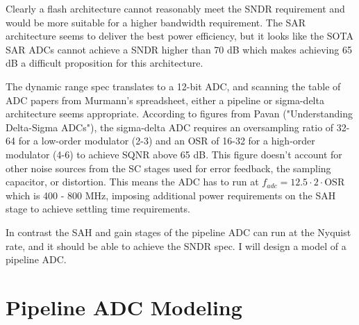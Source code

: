 \documentclass[11pt]{article}
\begin{document}
Clearly a flash architecture cannot reasonably meet the SNDR requirement and would be more suitable for a higher bandwidth requirement.
The SAR architecture seems to deliver the best power efficiency, but it looks like the SOTA SAR ADCs cannot achieve a SNDR higher than 70 dB which makes achieving 65 dB a difficult proposition for this architecture.

The dynamic range spec translates to a 12-bit ADC, and scanning the table of ADC papers from Murmann's spreadsheet, either a pipeline or sigma-delta architecture seems appropriate.
According to figures from Pavan ("Understanding Delta-Sigma ADCs"), the sigma-delta ADC requires an oversampling ratio of 32-64 for a low-order modulator (2-3) and an OSR of 16-32 for a high-order modulator (4-6) to achieve SQNR above 65 dB.
This figure doesn't account for other noise sources from the SC stages used for error feedback, the sampling capacitor, or distortion.
This means the ADC has to run at $f_{adc} = 12.5 \cdot 2 \cdot \text{OSR}$ which is 400 - 800 MHz, imposing additional power requirements on the SAH stage to achieve settling time requirements.

In contrast the SAH and gain stages of the pipeline ADC can run at the Nyquist rate, and it should be able to achieve the SNDR spec.
I will design a model of a pipeline ADC.

\section{Pipeline ADC Modeling}
\end{document}
